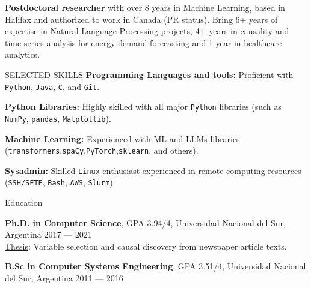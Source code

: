 \documentclass{resume}
\begin{document}
\vspace{-0.3cm}
\begin{rSection}{}
\textbf{Postdoctoral researcher} with over 8 years in Machine Learning, based in Halifax and authorized to work in Canada (PR status). Bring 6+ years of expertise in Natural Language Processing projects, 4+ years in causality and time series analysis for energy demand forecasting and 1 year in healthcare analytics.

\end{rSection}





\vspace{-0.2cm}
\begin{rSection}{SELECTED SKILLS}
\textbf{Programming Languages and tools:} Proficient with \texttt{Python}, \texttt{Java}, \texttt{C}, and \texttt{Git}.
\vspace{-0.25cm}

\textbf{Python Libraries:} Highly skilled with all major \texttt{Python} libraries (such as \texttt{NumPy}, \texttt{pandas}, \texttt{Matplotlib}).
\vspace{-0.25cm}

\textbf{Machine Learning:} Experienced with ML and LLMs libraries (\texttt{transformers},\texttt{spaCy},\texttt{PyTorch},\texttt{sklearn}, and others).
\vspace{-0.75cm}

\textbf{Sysadmin:} Skilled \texttt{Linux} enthusiast experienced in remote computing resources (\texttt{SSH/SFTP}, \texttt{Bash}, \texttt{AWS}, \texttt{Slurm}).
\end{rSection}

\vspace{-0.3cm}
\begin{rSection}{Education}

{\bf Ph.D. in Computer Science}, GPA 3.94/4, Universidad Nacional del Sur, Argentina \hfill {2017 --- 2021}\\
\underline{Thesis}: Variable selection and causal discovery from  newspaper article texts.\\

\vspace{-0.6cm}


{\bf B.Sc in Computer Systems Engineering}, GPA 3.51/4, Universidad Nacional del Sur, Argentina \hfill {2011 --- 2016}\\
\vspace{-0.2cm}
\end{rSection}
\end{document}
